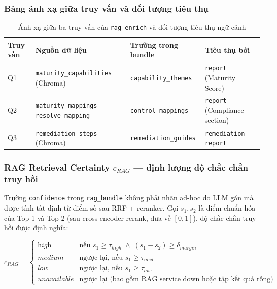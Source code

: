 \subsubsection*{Bảng ánh xạ giữa truy vấn và đối tượng tiêu thụ}
\begin{table}[!htb]
  \centering
  \caption{Ánh xạ giữa ba truy vấn của \texttt{rag\_enrich} và đối tượng tiêu thụ ngữ cảnh}
  \label{tab:rag_enrich_consumers}
  \begin{tabular}{|l|l|l|l|}
    \hline
    \textbf{Truy vấn} & \textbf{Nguồn dữ liệu} & \textbf{Trường trong bundle} & \textbf{Tiêu thụ bởi} \\
    \hline
    Q1 & \texttt{maturity\_capabilities} (Chroma) & \texttt{capability\_themes} & \texttt{report} (Maturity Score) \\ \hline
    Q2 & \texttt{maturity\_mappings} + \texttt{resolve\_mapping} & \texttt{control\_mappings} & \texttt{report} (Compliance section) \\ \hline
    Q3 & \texttt{remediation\_steps} (Chroma) & \texttt{remediation\_guides} & \texttt{remediation} + \texttt{report} \\ \hline
  \end{tabular}
\end{table}

\subsubsection*{RAG Retrieval Certainty $c_{RAG}$ — định lượng độ chắc chắn truy hồi}
\label{subsec:retrieval_certainty}

Trường \texttt{confidence} trong \texttt{rag\_bundle} không phải nhãn ad-hoc do LLM gán mà được tính tất định từ điểm số sau RRF + reranker. Gọi $s_1, s_2$ là điểm chuẩn hóa của Top-1 và Top-2 (sau cross-encoder rerank, đưa về $[0,1]$), độ chắc chắn truy hồi được định nghĩa:

\begin{equation}
  c_{RAG} = \begin{cases}
    \textit{high}        & \text{nếu } s_1 \geq \tau_{high} \;\wedge\; (s_1 - s_2) \geq \delta_{margin} \\
    \textit{medium}      & \text{ngược lại, nếu } s_1 \geq \tau_{med} \\
    \textit{low}         & \text{ngược lại, nếu } s_1 \geq \tau_{low} \\
    \textit{unavailable} & \text{ngược lại (bao gồm RAG service down hoặc tập kết quả rỗng)}
  \end{cases}
  \label{eq:rag_confidence}
\end{equation}


